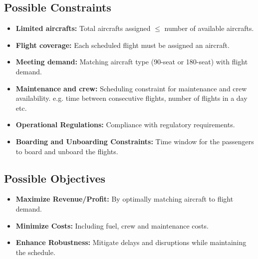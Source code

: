 \documentclass[11pt]{article}
\begin{document}
\subsection*{Possible Constraints}
\begin{itemize}
    \item \textbf{Limited aircrafts:} Total aircrafts assigned \(\leq\) number of available aircrafts.
    \item \textbf{Flight coverage:} Each scheduled flight must be assigned an aircraft.
    \item \textbf{Meeting demand:} Matching aircraft type (90-seat or 180-seat) with flight demand.
    \item \textbf{Maintenance and crew:} Scheduling constraint for maintenance and crew availability. e.g. time between consecutive flights, number of flights in a day etc.
    \item \textbf{Operational Regulations:} Compliance with regulatory requirements.
    \item \textbf{Boarding and Unboarding Constraints:} Time window for the passengers to board and unboard the flights.
\end{itemize}

\subsection*{Possible Objectives}
\begin{itemize}
    \item \textbf{Maximize Revenue/Profit:} By optimally matching aircraft to flight demand.
    \item \textbf{Minimize Costs:} Including fuel, crew and maintenance costs.
    \item \textbf{Enhance Robustness:} Mitigate delays and disruptions while maintaining the schedule.
\end{itemize}
\end{document}
